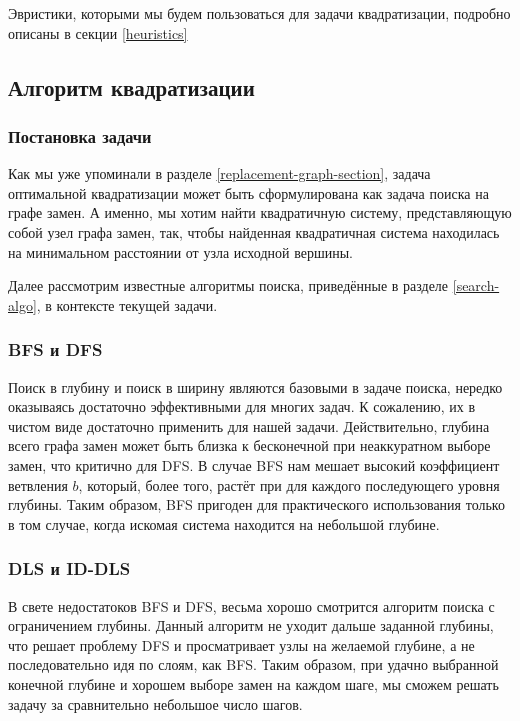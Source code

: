 Эвристики, которыми мы будем пользоваться для задачи квадратизации, подробно описаны в секции \ref{heuristics}

\subsection{Алгоритм квадратизации} \label{quad-algo}

\subsubsection{Постановка задачи}

Как мы уже упоминали в разделе \ref{replacement-graph-section}, задача оптимальной квадратизации может быть сформулирована как задача поиска на графе замен. А именно, мы хотим найти квадратичную систему, представляющую собой узел графа замен, так, чтобы найденная квадратичная система находилась на минимальном расстоянии от узла исходной вершины.

Далее рассмотрим известные алгоритмы поиска, приведённые в разделе \ref{search-algo}, в контексте текущей задачи.

\subsubsection{BFS и DFS}

Поиск в глубину и поиск в ширину являются базовыми в задаче поиска, нередко оказываясь достаточно эффективными для многих задач. К сожалению, их в чистом виде достаточно применить для нашей задачи. Действительно, глубина всего графа замен может быть близка к бесконечной при неаккуратном выборе замен, что критично для DFS. В случае BFS нам мешает высокий коэффициент ветвления $b$, который, более того, растёт при для каждого последующего уровня глубины. Таким образом, BFS пригоден для практического использования только в том случае, когда искомая система находится на небольшой глубине. 

\subsubsection{DLS и ID-DLS}

В свете недостатоков BFS и DFS, весьма хорошо смотрится алгоритм поиска с ограничением глубины. Данный алгоритм не уходит дальше заданной глубины, что решает проблему DFS и просматривает узлы на желаемой глубине, а не последовательно идя по слоям, как BFS. Таким образом, при удачно выбранной конечной глубине и хорошем выборе замен на каждом шаге, мы сможем решать задачу за сравнительно небольшое число шагов.

